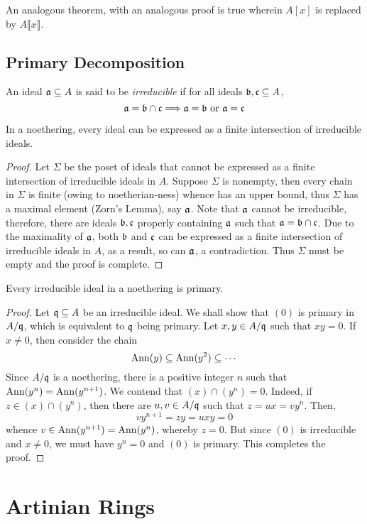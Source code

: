 An analogous theorem, with an analogous proof is true wherein $A[x]$ is replaced by $A\llbracket x\rrbracket$.

\subsection{Primary Decomposition}

\begin{definition}[Irreducible]
    An ideal $\mathfrak a\subseteq A$ is said to be \textit{irreducible} if for all ideals $\mathfrak b,\mathfrak c\subseteq A$,
    \begin{equation*}
        \mathfrak a = \mathfrak b\cap\mathfrak c\Longrightarrow \mathfrak a = \mathfrak b\text{ or }\mathfrak a = \mathfrak c
    \end{equation*}
\end{definition}

\begin{lemma}
    In a noethering, every ideal can be expressed as a finite intersection of irreducible ideals.
\end{lemma}
\begin{proof}
    Let $\Sigma$ be the poset of ideals that cannot be expressed as a finite intersection of irreducible ideals in $A$. Suppose $\Sigma$ is nonempty, then every chain in $\Sigma$ is finite (owing to noetherian-ness) whence has an upper bound, thus $\Sigma$ has a maximal element (Zorn's Lemma), say $\mathfrak a$. Note that $\mathfrak a$ cannot be irreducible, therefore, there are ideals $\mathfrak b,\mathfrak c$ properly containing $\mathfrak a$ such that $\mathfrak a = \mathfrak b\cap\mathfrak c$. Due to the maximality of $\mathfrak a$, both $\mathfrak b$ and $\mathfrak c$ can be expressed as a finite intersection of irreducible ideals in $A$, as a result, so can $\mathfrak a$, a contradiction. Thus $\Sigma$ must be empty and the proof is complete.
\end{proof}

\begin{lemma}
    Every irreducible ideal in a noethering is primary.
\end{lemma}
\begin{proof}
    Let $\mathfrak q\subseteq A$ be an irreducible ideal. We shall show that $(0)$ is primary in $A/\mathfrak q$, which is equivalent to $\mathfrak q$ being primary. Let $x,y\in A/\mathfrak q$ such that $xy = 0$. If $x\ne 0$, then consider the chain 
    \begin{equation*}
        \operatorname{Ann}(y)\subseteq\operatorname{Ann}(y^2)\subseteq\cdots
    \end{equation*}
    Since $A/\mathfrak q$ is a noethering, there is a positive integer $n$ such that $\operatorname{Ann}(y^n) = \operatorname{Ann}(y^{n + 1})$. We contend that $(x)\cap(y^n) = 0$. Indeed, if $z\in(x)\cap(y^n)$, then there are $u,v\in A/\mathfrak q$ such that $z = ux = vy^n$. Then,
    \begin{equation*}
        vy^{n + 1} = zy = uxy = 0
    \end{equation*}
    whence $v\in\operatorname{Ann}(y^{n + 1}) = \operatorname{Ann}(y^n)$, whereby $z = 0$. But since $(0)$ is irreducible and $x\ne 0$, we must have $y^n = 0$ and $(0)$ is primary. This completes the proof.
\end{proof}

\section{Artinian Rings}
